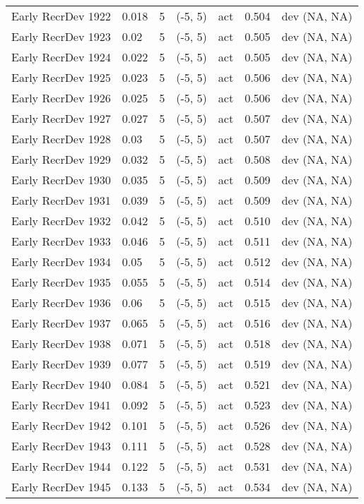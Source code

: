 \documentclass[11pt,
  letterpaper,
]{article}
\begin{document}
\begin{landscape}
\begin{longtable}[t]{>{\raggedright\arraybackslash}p{7.5cm}lllll>{\raggedright\arraybackslash}p{3.5cm}}
Early RecrDev 1922 & 0.018 & 5 & (-5, 5) & act & 0.504 & dev (NA, NA)\\
Early RecrDev 1923 & 0.02 & 5 & (-5, 5) & act & 0.505 & dev (NA, NA)\\
Early RecrDev 1924 & 0.022 & 5 & (-5, 5) & act & 0.505 & dev (NA, NA)\\
Early RecrDev 1925 & 0.023 & 5 & (-5, 5) & act & 0.506 & dev (NA, NA)\\
Early RecrDev 1926 & 0.025 & 5 & (-5, 5) & act & 0.506 & dev (NA, NA)\\
Early RecrDev 1927 & 0.027 & 5 & (-5, 5) & act & 0.507 & dev (NA, NA)\\
Early RecrDev 1928 & 0.03 & 5 & (-5, 5) & act & 0.507 & dev (NA, NA)\\
Early RecrDev 1929 & 0.032 & 5 & (-5, 5) & act & 0.508 & dev (NA, NA)\\
Early RecrDev 1930 & 0.035 & 5 & (-5, 5) & act & 0.509 & dev (NA, NA)\\
Early RecrDev 1931 & 0.039 & 5 & (-5, 5) & act & 0.509 & dev (NA, NA)\\
Early RecrDev 1932 & 0.042 & 5 & (-5, 5) & act & 0.510 & dev (NA, NA)\\
Early RecrDev 1933 & 0.046 & 5 & (-5, 5) & act & 0.511 & dev (NA, NA)\\
Early RecrDev 1934 & 0.05 & 5 & (-5, 5) & act & 0.512 & dev (NA, NA)\\
Early RecrDev 1935 & 0.055 & 5 & (-5, 5) & act & 0.514 & dev (NA, NA)\\
Early RecrDev 1936 & 0.06 & 5 & (-5, 5) & act & 0.515 & dev (NA, NA)\\
Early RecrDev 1937 & 0.065 & 5 & (-5, 5) & act & 0.516 & dev (NA, NA)\\
Early RecrDev 1938 & 0.071 & 5 & (-5, 5) & act & 0.518 & dev (NA, NA)\\
Early RecrDev 1939 & 0.077 & 5 & (-5, 5) & act & 0.519 & dev (NA, NA)\\
Early RecrDev 1940 & 0.084 & 5 & (-5, 5) & act & 0.521 & dev (NA, NA)\\
Early RecrDev 1941 & 0.092 & 5 & (-5, 5) & act & 0.523 & dev (NA, NA)\\
Early RecrDev 1942 & 0.101 & 5 & (-5, 5) & act & 0.526 & dev (NA, NA)\\
Early RecrDev 1943 & 0.111 & 5 & (-5, 5) & act & 0.528 & dev (NA, NA)\\
Early RecrDev 1944 & 0.122 & 5 & (-5, 5) & act & 0.531 & dev (NA, NA)\\
Early RecrDev 1945 & 0.133 & 5 & (-5, 5) & act & 0.534 & dev (NA, NA)\\

\end{longtable}
\end{landscape}
\end{document}
